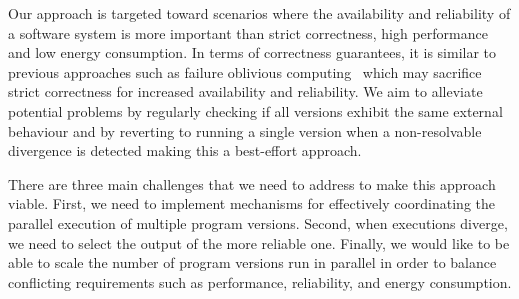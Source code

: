 Our approach is targeted toward scenarios where the availability and
reliability of a software system is more important than strict correctness,
high performance and low energy consumption.  In terms of correctness
guarantees, it is similar to previous approaches such as failure oblivious
computing~\cite{fo} which may sacrifice strict correctness for increased
availability and reliability. We aim to alleviate potential problems by
regularly checking if all versions exhibit the same external behaviour and by
reverting to running a single version when a non-resolvable divergence is
detected making this a best-effort approach.


There are three main challenges that we need to address to make this approach
viable. First, we need to implement mechanisms for effectively coordinating the
parallel execution of multiple program versions.  Second, when executions
diverge, we need to select the output of the more reliable one.  Finally, we
would like to be able to scale the number of program versions run in parallel
in order to balance conflicting requirements such as performance, reliability,
and energy consumption.




